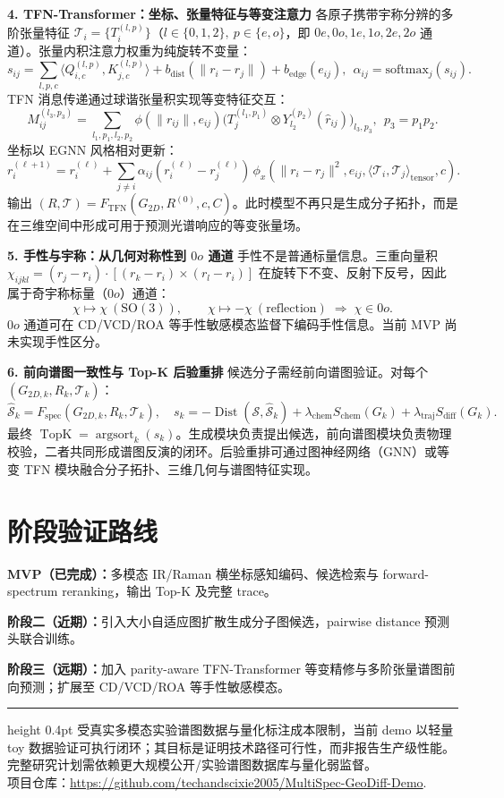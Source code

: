 \documentclass[10pt,a4paper]{ctexart}
\newcommand{\spec}{\mathcal S}
\begin{document}
\textbf{4. TFN-Transformer：坐标、张量特征与等变注意力} \quad
各原子携带宇称分辨的多阶张量特征 $\mathcal T_i = \{T_i^{(l,p)}\}$（$l\in\{0,1,2\},\ p\in\{e,o\}$，即 $0e,0o,1e,1o,2e,2o$ 通道）。张量内积注意力权重为纯旋转不变量：
\[
s_{ij} = \sum_{l,p,c} \langle Q_{i,c}^{(l,p)}, K_{j,c}^{(l,p)}\rangle + b_{\mathrm{dist}}(\|r_i-r_j\|) + b_{\mathrm{edge}}(e_{ij}),\ \ \alpha_{ij} = \mathrm{softmax}_j(s_{ij}).
\]
TFN 消息传递通过球谐张量积实现等变特征交互：
\[
M_{ij}^{(l_3,p_3)} = \sum_{l_1,p_1,l_2,p_2} \phi(\|r_{ij}\|,e_{ij}) \bigl(T_j^{(l_1,p_1)} \otimes Y_{l_2}^{(p_2)}(\hat r_{ij})\bigr)_{l_3,p_3},\ \ p_3 = p_1p_2.
\]
坐标以 EGNN 风格相对更新：
\[
r_i^{(\ell+1)} = r_i^{(\ell)} + \sum_{j \neq i} \alpha_{ij} (r_i^{(\ell)}-r_j^{(\ell)})\, \phi_x(\|r_i-r_j\|^2, e_{ij}, \langle \mathcal T_i,\mathcal T_j\rangle_{\mathrm{tensor}}, c).
\]
输出 $(R,\mathcal T)=F_{\mathrm{TFN}}(G_{2D},R^{(0)},c,C)$。此时模型不再只是生成分子拓扑，而是在三维空间中形成可用于预测光谱响应的等变张量场。

\textbf{5. 手性与宇称：从几何对称性到 $0o$ 通道} \quad
手性不是普通标量信息。三重向量积 $\chi_{ijkl} = (r_j - r_i) \cdot [(r_k - r_i) \times (r_l - r_i)]$ 在旋转下不变、反射下反号，因此属于奇宇称标量（$0o$）通道：
\[
\chi \mapsto \chi\ (\mathrm{SO(3)}),\qquad \chi \mapsto -\chi\ (\mathrm{reflection}) \;\Longrightarrow\; \chi \in 0o.
\]
$0o$ 通道可在 CD/VCD/ROA 等手性敏感模态监督下编码手性信息。当前 MVP 尚未实现手性区分。

\textbf{6. 前向谱图一致性与 Top-K 后验重排} \quad
候选分子需经前向谱图验证。对每个 $(G_{2D,k}, R_k, \mathcal T_k)$：
\[
\hat{\spec}_k = F_{\mathrm{spec}}(G_{2D,k}, R_k, \mathcal T_k),\quad
s_k = -\operatorname{Dist}(\spec, \hat{\spec}_k) + \lambda_{\mathrm{chem}} S_{\mathrm{chem}}(G_k) + \lambda_{\mathrm{traj}} S_{\mathrm{diff}}(G_k).
\]
最终 $\operatorname{TopK} = \operatorname{argsort}_k(s_k)$。生成模块负责提出候选，前向谱图模块负责物理校验，二者共同形成谱图反演的闭环。后验重排可通过图神经网络（GNN）或等变 TFN 模块融合分子拓扑、三维几何与谱图特征实现。

\section*{阶段验证路线}
\vspace{-2pt}

\textbf{MVP（已完成）：}多模态 IR/Raman 横坐标感知编码、候选检索与 forward-spectrum reranking，输出 Top-K 及完整 trace。

\textbf{阶段二（近期）：}引入大小自适应图扩散生成分子图候选，pairwise distance 预测头联合训练。

\textbf{阶段三（远期）：}加入 parity-aware TFN-Transformer 等变精修与多阶张量谱图前向预测；扩展至 CD/VCD/ROA 等手性敏感模态。

\vspace{4pt}
\hrule height 0.4pt
\vspace{3pt}
{\small
受真实多模态实验谱图数据与量化标注成本限制，当前 demo 以轻量 toy 数据验证可执行闭环；其目标是证明技术路径可行性，而非报告生产级性能。完整研究计划需依赖更大规模公开/实验谱图数据库与量化弱监督。\\
项目仓库：\url{https://github.com/techandscixie2005/MultiSpec-GeoDiff-Demo}.}
\end{document}
